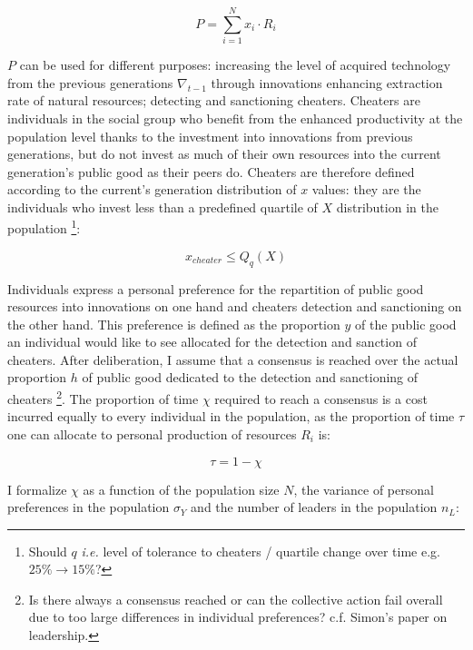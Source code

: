 \documentclass[a4paper]{article}
\begin{document}
\begin{equation} \label{eq:pubgood}
P = \sum_{i=1}^{N}x_i\cdot R_i
\end{equation}

$P$ can be used for different purposes: increasing the level of acquired technology from the previous generations $\nabla_{t-1}$ through innovations enhancing extraction rate of natural resources; detecting and sanctioning cheaters. Cheaters are individuals in the social group who benefit from the enhanced productivity at the population level thanks to the investment into innovations from previous generations, but do not invest as much of their own resources into the current generation's public good as their peers do. Cheaters are therefore defined according to the current's generation distribution of $x$ values: they are the individuals who invest less than a predefined quartile of $X$ distribution in the population \footnote{Should $q$ \textit{i.e.} level of tolerance to cheaters / quartile change over time e.g. $25\%\to15\%$?}:

\begin{equation} \label{eq:cheat}
x_{cheater}\leq Q_q\left(X\right)
\end{equation}

Individuals express a personal preference for the repartition of public good resources into innovations on one hand and cheaters detection and sanctioning on the other hand. This preference is defined as the proportion $y$ of the public good an individual would like to see allocated for the detection and sanction of cheaters. After deliberation, I assume that a consensus is reached over the actual proportion $h$ of public good dedicated to the detection and sanctioning of cheaters \footnote{Is there always a consensus reached or can the collective action fail overall due to too large differences in individual preferences? c.f. Simon's paper on leadership.}. The proportion of time $\chi$ required to reach a consensus is a cost incurred equally to every individual in the population, as the proportion of time $\tau$ one can allocate to personal production of resources $R_i$ is: 

\begin{equation}
\tau=1-\chi
\end{equation}

I formalize $\chi$ as a function of the population size $N$, the variance of personal preferences in the population $\sigma_Y$ and the number of leaders in the population $n_L$:
\end{document}
